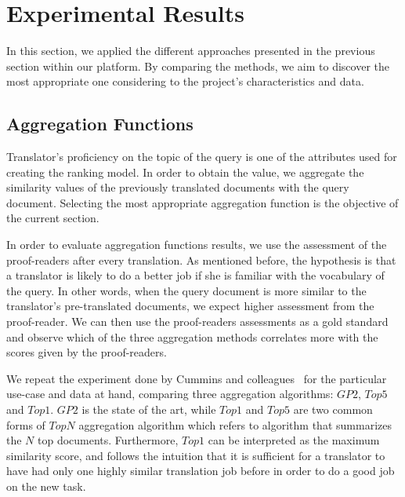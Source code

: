 \section{Experimental Results}
\label{sec:apply}
In this section, we applied the different approaches presented in the previous section within our platform. By comparing the methods, we aim to discover the most appropriate one considering to the project's characteristics and data. 

\subsection{Aggregation Functions}
Translator's proficiency on the topic of the query is one of the attributes used for creating the ranking model. In order to obtain the value, we aggregate the similarity values of the previously translated documents with the query document. Selecting the most appropriate aggregation function is the objective of the current section.

In order to evaluate aggregation functions results, we use the assessment of the proof-readers after every translation. As mentioned before, the hypothesis is that a translator is likely to do a better job if she is familiar with the vocabulary of the query. In other words, when the query document is more similar to the translator's pre-translated documents, we expect higher assessment from the proof-reader. We can then use the proof-readers assessments as a gold standard and observe which of the three aggregation methods correlates more with the scores given by the proof-readers. 

We repeat the experiment done by Cummins and colleagues~\cite{agg-gp2} for the particular use-case and data at hand, comparing three aggregation algorithms: $GP2$, $Top5$ and $Top1$. $GP2$ is the state of the art, while $Top1$ and $Top5$ are two common forms of $TopN$ aggregation algorithm which refers to algorithm that summarizes the $N$ top documents. Furthermore, $Top1$ can be interpreted as the maximum similarity score, and follows the intuition that it is sufficient for a translator to have had only one highly similar translation job before in order to do a good job on the new task.


